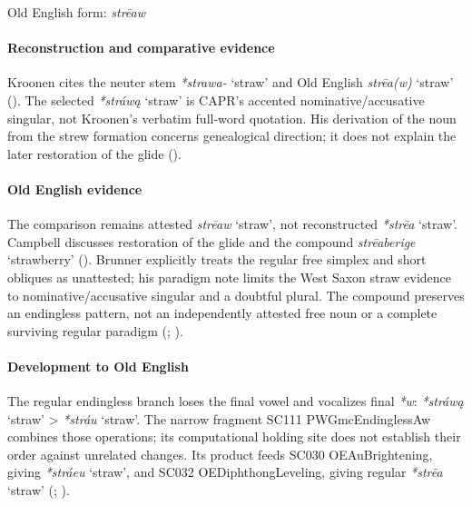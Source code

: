 \documentclass[
  british,
  a4paper,
]{article}
\providecommand{\Recon}[1]{\emph{*#1}}
\begin{document}
Old English form: \emph{strēaw}

\paragraph{Reconstruction and comparative
evidence}\label{reconstruction-and-comparative-evidence-146}

Kroonen cites the neuter stem \Recon{strawa-} `straw' and Old English
{\emph{strēa(w)}} `straw' (). The selected \Recon{stráwą} `straw' is CAPR's accented
nominative/accusative singular, not Kroonen's verbatim full-word
quotation. His derivation of the noun from the strew formation concerns
genealogical direction; it does not explain the later restoration of the
glide ().

\paragraph{Old English evidence}\label{old-english-evidence-148}

The comparison remains attested {\emph{strēaw}} `straw', not
reconstructed \Recon{strēa} `straw'. Campbell discusses restoration of
the glide and the compound {\emph{strēaberige}} `strawberry'
(). Brunner
explicitly treats the regular free simplex and short obliques as
unattested; his paradigm note limits the West Saxon straw evidence to
nominative/accusative singular and a doubtful plural. The compound
preserves an endingless pattern, not an independently attested free noun
or a complete surviving regular paradigm
(;
).

\paragraph{Development to Old
English}\label{development-to-old-english-147}

The regular endingless branch loses the final vowel and vocalizes final
\Recon{w}: \Recon{stráwą} `straw' \textgreater{} \Recon{stráu} `straw'.
The narrow fragment SC111 PWGmcEndinglessAw combines those operations;
its computational holding site does not establish their order against
unrelated changes. Its product feeds SC030 OEAuBrightening, giving
\Recon{stráeu} `straw', and SC032 OEDiphthongLeveling, giving regular
\Recon{strēa} `straw' (; ).
\end{document}
